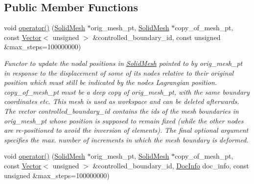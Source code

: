 \subsection*{Public Member Functions}
\begin{DoxyCompactItemize}
\item 
void \hyperlink{classoomph_1_1NonLinearElasticitySmoothMesh_a08291c80b1b4e30fdce23be10c54d3bb}{operator()} (\hyperlink{classoomph_1_1SolidMesh}{Solid\+Mesh} $\ast$orig\+\_\+mesh\+\_\+pt, \hyperlink{classoomph_1_1SolidMesh}{Solid\+Mesh} $\ast$copy\+\_\+of\+\_\+mesh\+\_\+pt, const \hyperlink{classoomph_1_1Vector}{Vector}$<$ unsigned $>$ \&controlled\+\_\+boundary\+\_\+id, const unsigned \&max\+\_\+steps=100000000)
\begin{DoxyCompactList}\small\item\em Functor to update the nodal positions in \hyperlink{classoomph_1_1SolidMesh}{Solid\+Mesh} pointed to by orig\+\_\+mesh\+\_\+pt in response to the displacement of some of its nodes relative to their original position which must still be indicated by the nodes\textquotesingle{} Lagrangian position. copy\+\_\+of\+\_\+mesh\+\_\+pt must be a deep copy of orig\+\_\+mesh\+\_\+pt, with the same boundary coordinates etc. This mesh is used as workspace and can be deleted afterwards. The vector controlled\+\_\+boundary\+\_\+id contains the ids of the mesh boundaries in orig\+\_\+mesh\+\_\+pt whose position is supposed to remain fixed (while the other nodes are re-\/positioned to avoid the inversion of elements). The final optional argument specifies the max. number of increments in which the mesh boundary is deformed. \end{DoxyCompactList}\item 
void \hyperlink{classoomph_1_1NonLinearElasticitySmoothMesh_a426905484f20903c02c995b297df36a6}{operator()} (\hyperlink{classoomph_1_1SolidMesh}{Solid\+Mesh} $\ast$orig\+\_\+mesh\+\_\+pt, \hyperlink{classoomph_1_1SolidMesh}{Solid\+Mesh} $\ast$copy\+\_\+of\+\_\+mesh\+\_\+pt, const \hyperlink{classoomph_1_1Vector}{Vector}$<$ unsigned $>$ \&controlled\+\_\+boundary\+\_\+id, \hyperlink{classoomph_1_1DocInfo}{Doc\+Info} doc\+\_\+info, const unsigned \&max\+\_\+steps=100000000)

\end{DoxyCompactItemize}
